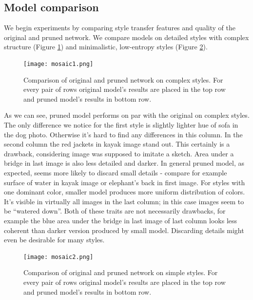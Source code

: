 \documentclass[../Main.tex]{subfiles}
\begin{document}
\subsection{Model comparison}
We begin experiments by comparing style transfer features and quality of the
original and pruned network. We compare models on detailed styles with complex 
structure (Figure \ref{fig:mosaic1}) and minimalistic, low-entropy styles 
(Figure \ref{fig:mosaic2}). 
        \begin{figure}[ht!]
        \centering
            \texttt{[image: mosaic1.png]}
            \caption{Comparison of original and pruned network on complex styles. 
            For every pair of rows original model's results are placed in the
            top row and pruned model's results in bottom row.
            }
            \label{fig:mosaic1}
        \end{figure}
As we can see, pruned model performs on par with the original on complex styles.
The only difference we notice for the first style is slightly lighter hue of sofa
in the dog photo. Otherwise it's hard to find any differences in this column.
In the second column the red jackets in kayak image stand out. This certainly is a drawback,
considering image was supposed to imitate a sketch. Area under a bridge in last 
image is also less detailed and darker. In general pruned model, as expected,
seems more likely to discard small details - compare for example surface of water in kayak image
or elephant's back in first image. For styles with one dominant color, smaller
model produces more uniform distribution of colors. It's visible in virtually
all images in the last column; in this case images seem to be ``watered down''.
Both of these traits are not necessarily drawbacks, for example the blue area
under the bridge in last image of last column looks less coherent than darker version
produced by small model. Discarding details might even be desirable for many styles.

        \begin{figure}[ht!]
        \centering
            \texttt{[image: mosaic2.png]}
            \caption{Comparison of original and pruned network on simple styles. 
            For every pair of rows original model's results are placed in the
            top row and pruned model's results in bottom row.
            }
            \label{fig:mosaic2}
        \end{figure} 
 
\end{document}
